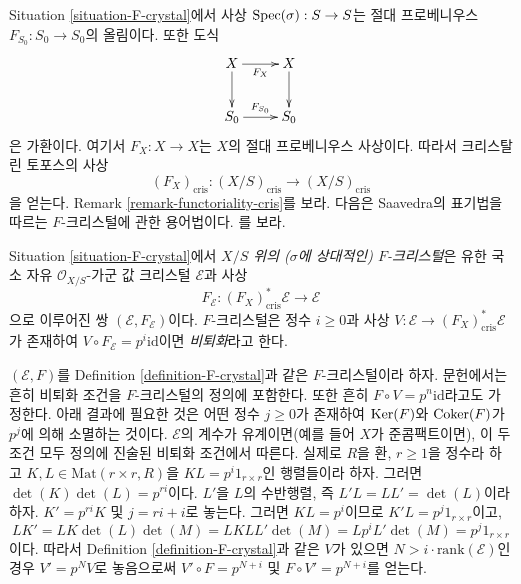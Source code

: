 \noindent
Situation \ref{situation-F-crystal}에서 사상
$\mathop{\mathrm{Spec}}(\sigma) : S \to S$는 절대 프로베니우스
$F_{S_0} : S_0 \to S_0$의 올림이다. 또한 도식
$$
\xymatrix{
X \ar[d] \ar[r]_{F_X} & X \ar[d] \\
S_0 \ar[r]^{F_{S_0}} & S_0
}
$$
은 가환이다. 여기서 $F_X : X \to X$는 $X$의 절대 프로베니우스
사상이다. 따라서 크리스탈린 토포스의 사상
$$
(F_X)_{\text{cris}} :
(X/S)_{\text{cris}}
\longrightarrow
(X/S)_{\text{cris}}
$$
을 얻는다. Remark \ref{remark-functoriality-cris}를 보라. 다음은
Saavedra의 표기법을 따르는 $F$-크리스털에 관한 용어법이다.
\cite{Saavedra}를 보라.

\begin{definition}
\label{definition-F-crystal}
Situation \ref{situation-F-crystal}에서 {\it $X/S$ 위의
($\sigma$에 상대적인) $F$-크리스털}은 유한 국소 자유
$\mathcal{O}_{X/S}$-가군 값 크리스털 $\mathcal{E}$과 사상
$$
F_\mathcal{E} : (F_X)_{\text{cris}}^*\mathcal{E} \longrightarrow \mathcal{E}
$$
으로 이루어진 쌍 $(\mathcal{E}, F_\mathcal{E})$이다. $F$-크리스털은
정수 $i \geq 0$과 사상
$V : \mathcal{E} \to (F_X)_{\text{cris}}^*\mathcal{E}$가 존재하여
$V \circ F_{\mathcal{E}} = p^i \text{id}$이면 {\it 비퇴화}라고 한다.
\end{definition}

\begin{remark}
\label{remark-F-crystal-variants}
$(\mathcal{E}, F)$를 Definition \ref{definition-F-crystal}과 같은
$F$-크리스털이라 하자. 문헌에서는 흔히 비퇴화 조건을
$F$-크리스털의 정의에 포함한다. 또한 흔히
$F \circ V = p^n\text{id}$라고도 가정한다. 아래 결과에 필요한 것은
어떤 정수 $j \geq 0$가 존재하여 $\mathop{\mathrm{Ker}}(F)$와 $\mathop{\mathrm{Coker}}(F)$가
$p^j$에 의해 소멸하는 것이다. $\mathcal{E}$의 계수가 유계이면(예를
들어 $X$가 준콤팩트이면), 이 두 조건 모두 정의에 진술된 비퇴화
조건에서 따른다. 실제로 $R$을 환, $r \geq 1$을 정수라 하고
$K, L \in \text{Mat}(r \times r, R)$을
$K L = p^i 1_{r \times r}$인 행렬들이라 하자. 그러면
$\det(K)\det(L) = p^{ri}$이다. $L'$을 $L$의 수반행렬, 즉
$L' L = L L' = \det(L)$이라 하자. $K' = p^{ri} K$ 및
$j = ri + i$로 놓는다. 그러면 $K L = p^i$이므로
$K' L = p^j 1_{r \times r}$이고,
$$
L K' = L K \det(L) \det(M) = L K L L' \det(M) = L p^i L' \det(M) =
p^j 1_{r \times r}
$$
이다. 따라서 Definition \ref{definition-F-crystal}과 같은 $V$가 있으면
$N > i \cdot \text{rank}(\mathcal{E})$인 경우
$V' = p^N V$로 놓음으로써
$V' \circ F = p^{N + i}$ 및 $F \circ V' = p^{N + i}$를 얻는다.
\end{remark}

